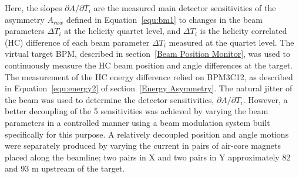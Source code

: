 Here, the slopes $\partial A /\partial T_{i}$ are the measured main detector sensitivities of the asymmetry $A_{raw}$ defined in Equation~\ref{equ:bm1} to changes in the beam parameters $\Delta T_{i}$ at the helicity quartet level, and $\Delta T_{i}$ is the helicity correlated (HC) difference of each beam parameter $\Delta T_{i}$ measured at the quartet level. The virtual target BPM, described in section~\ref{Beam Position Monitor}, was used to continuously measure the HC beam position and angle differences at the target. The measurement of the HC energy difference relied on BPM3C12, as described in Equation~\ref{equ:energy2} of section~\ref{Energy Asymmetry}. The natural jitter of the beam was used to determine the detector sensitivities, $\partial A /\partial T_{i}$. However, a better decoupling of the 5 sensitivities was achieved by varying the beam parameters in a controlled manner using a beam modulation system built specifically for this purpose. A relatively decoupled position and angle motions were separately produced by varying the current in pairs of air-core magnets placed along the beamline; two pairs in X and two pairs in Y approximately 82 and 93 m upstream of the target. 


